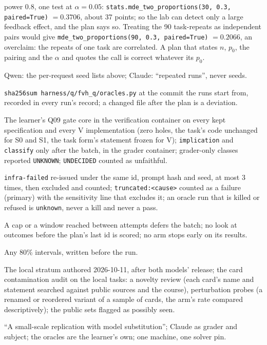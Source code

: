 \documentclass[11pt]{article}
\begin{document}
\begin{description}
  power 0.8, one test at $\alpha = 0.05$:
  \texttt{stats.mde\_two\_proportions(30, 0.3, paired=True)} $= 0.3706$, about
  37 points; so the lab can detect only a large feedback effect, and the plan
  says so. Treating the 90 task-repeats as independent pairs would give
  \texttt{mde\_two\_proportions(90, 0.3, paired=True)} $= 0.2066$, an overclaim:
  the repeats of one task are correlated. A plan that states $n$, $p_0$, the
  pairing and the $\alpha$ and quotes the call is correct whatever its $p_0$.
\item[Seeds and repeats.] Qwen: the per-request seed lists above; Claude:
  ``repeated runs'', never seeds.
\item[Oracles' version.] \texttt{sha256sum harness/q/fvh\_q/oracles.py} at the
  commit the runs start from, recorded in every run's record; a changed file
  after the plan is a deviation.
\item[Cheat surface and gate.] The learner's Q09 gate core in the
  verification container on every kept specification and every V
  implementation (zero holes, the task's code unchanged for S0 and S1, the
  task form's statement frozen for V); \texttt{implication} and
  \texttt{classify} only after the batch, in the grader container;
  grader-only classes reported \texttt{UNKNOWN}; \texttt{UNDECIDED} counted as
  unfaithful.
\item[Exclusions.] \texttt{infra-failed} re-issued under the same id, prompt
  hash and seed, at most 3 times, then excluded and counted;
  \texttt{truncated:<cause>} counted as a failure (primary) with the
  sensitivity line that excludes it; an oracle run that is killed or refused
  is \texttt{unknown}, never a kill and never a pass.
\item[Stopping rule.] A cap or a window reached between attempts defers the
  batch; no look at outcomes before the plan's last id is scored; no arm stops
  early on its results.
\item[Prediction intervals.] Any 80\% intervals, written before the run.
\item[Contamination.] The local stratum authored 2026-10-11, after both
  models' release; the card contamination audit on the local tasks: a novelty
  review (each card's name and statement searched against public sources and
  the course), perturbation probes (a renamed or reordered variant of a sample
  of cards, the arm's rate compared descriptively); the public sets flagged as
  possibly seen.
\item[Disclosure.] ``A small-scale replication with model substitution''; Claude
  as grader and subject; the oracles are the learner's own; one machine, one
  solver pin.
\end{description}
\end{document}
